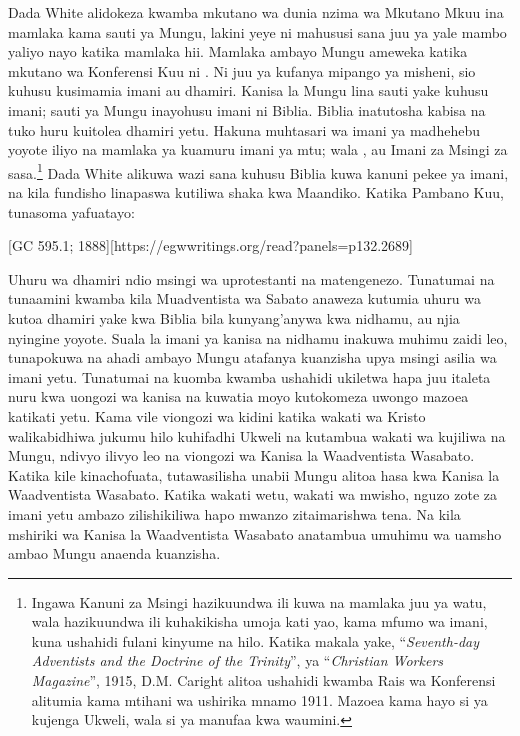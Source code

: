Dada White alidokeza kwamba mkutano wa dunia nzima wa Mkutano Mkuu ina mamlaka kama sauti ya Mungu, lakini yeye ni mahususi sana juu ya yale mambo yaliyo nayo katika mamlaka hii. Mamlaka ambayo Mungu ameweka katika mkutano wa Konferensi Kuu ni . Ni juu ya kufanya mipango ya misheni, sio kuhusu kusimamia imani au dhamiri. Kanisa la Mungu lina sauti yake kuhusu imani; sauti ya Mungu inayohusu imani ni Biblia. Biblia inatutosha kabisa na tuko huru kuitolea dhamiri yetu. Hakuna muhtasari wa imani ya madhehebu yoyote iliyo na mamlaka ya kuamuru imani ya mtu; wala , au Imani za Msingi za sasa.\footnote{Ingawa Kanuni za Msingi hazikuundwa ili kuwa na mamlaka juu ya watu, wala hazikuundwa ili kuhakikisha umoja kati yao, kama mfumo wa imani, kuna ushahidi fulani kinyume na hilo. Katika makala yake, “\textit{Seventh-day Adventists and the Doctrine of the Trinity}”, ya “\textit{Christian Workers Magazine}”, 1915, D.M. Caright alitoa ushahidi kwamba Rais wa Konferensi alitumia  kama mtihani wa ushirika mnamo 1911. Mazoea kama hayo si ya kujenga Ukweli, wala si ya manufaa kwa waumini.} Dada White alikuwa wazi sana kuhusu Biblia kuwa kanuni pekee ya imani, na kila fundisho linapaswa kutiliwa shaka kwa Maandiko. Katika Pambano Kuu, tunasoma yafuatayo:

[GC 595.1; 1888][https://egwwritings.org/read?panels=p132.2689]

Uhuru wa dhamiri ndio msingi wa uprotestanti na matengenezo. Tunatumai na tunaamini kwamba kila Muadventista wa Sabato anaweza kutumia uhuru wa kutoa dhamiri yake kwa Biblia bila kunyang'anywa kwa nidhamu, au njia nyingine yoyote. Suala la imani ya kanisa na nidhamu inakuwa muhimu zaidi leo, tunapokuwa na ahadi ambayo Mungu atafanya kuanzisha upya msingi asilia wa imani yetu. Tunatumai na kuomba kwamba ushahidi ukiletwa hapa juu italeta nuru kwa uongozi wa kanisa na kuwatia moyo kutokomeza uwongo mazoea katikati yetu. Kama vile viongozi wa kidini katika wakati wa Kristo walikabidhiwa jukumu hilo kuhifadhi Ukweli na kutambua wakati wa kujiliwa na Mungu, ndivyo ilivyo leo na viongozi wa Kanisa la Waadventista Wasabato. Katika kile kinachofuata, tutawasilisha unabii Mungu alitoa hasa kwa Kanisa la Waadventista Wasabato. Katika wakati wetu, wakati wa mwisho, nguzo zote za imani yetu ambazo zilishikiliwa hapo mwanzo zitaimarishwa tena. Na kila mshiriki wa Kanisa la Waadventista Wasabato anatambua umuhimu wa uamsho ambao Mungu anaenda kuanzisha.


